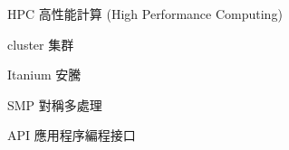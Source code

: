 
\begin{denotation}[3cm]

\item[HPC]{
  高性能計算 (High Performance Computing)
}

\item[cluster]{
  集群
}

\item[Itanium]{
  安騰
}

\item[SMP]{
  對稱多處理
}

\item[API]{
  應用程序編程接口
}

\end{denotation}
